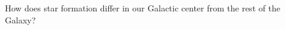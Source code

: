 \citep{Comparison to the Galactic Disk}
How does star formation differ in our Galactic center from the rest of the Galaxy? 